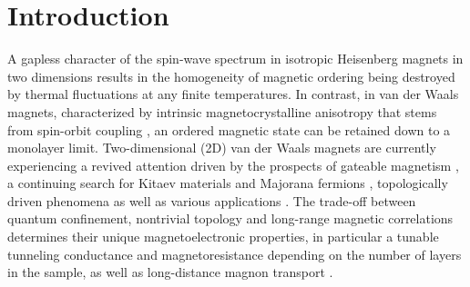 \documentclass[%
  twocolumn,
  aps,
  prb,
  amsmath,
  amssymb,
  superscriptaddress,
  nofootinbib,
  floatfix
]{revtex4-1}
\newcommand{\0}{^{\phantom{\dagger}}}
\begin{document}
\maketitle

\section{Introduction}

A gapless character of the spin-wave spectrum in isotropic Heisenberg magnets in two dimensions results in the homogeneity of magnetic ordering being destroyed by thermal fluctuations at any finite temperatures. In contrast, in van der Waals magnets, characterized by intrinsic magnetocrystalline anisotropy that stems from spin-orbit coupling \cite{Lado2017}, an ordered magnetic state can be retained down to a monolayer limit. Two-dimensional (2D) van der Waals magnets are currently experiencing a revived attention \cite{Gong2017,Herrero2017,Burch2018,Tokmachev2018,Gong2019,Novoselov2019,Cortie2019} driven by the prospects of gateable magnetism \cite{Huang2018,Shengwei2018,Wang2018,Deng2018}, a continuing search for Kitaev materials \cite{Nagler2019,Gordon2019} and Majorana fermions \cite{Livanas2019}, topologically driven phenomena \cite{Mokrousov2019} as well as various applications \cite{Herrero2017,Burch2018,Novoselov2019}. The trade-off between quantum confinement, nontrivial topology and long-range magnetic correlations determines their unique magnetoelectronic properties, in particular a tunable tunneling conductance \cite{Wang2018a} and magnetoresistance \cite{Song2018,Klein2018,Kim2018} depending on the number of layers in the sample, as well as long-distance magnon transport \cite{Xing2019}. 
\end{document}

